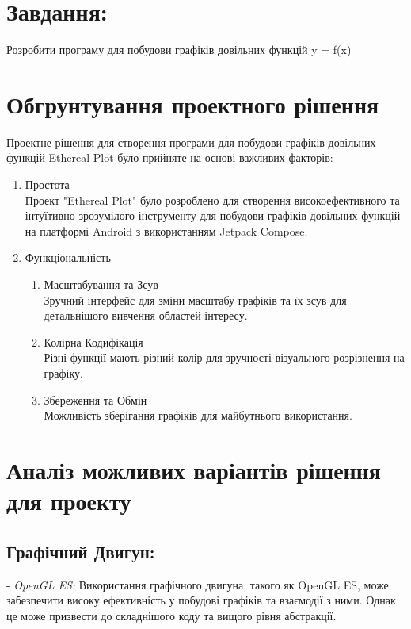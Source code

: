 \documentclass[14pt]{article}
\begin{document}
    \titlewithlabnum

    \tableofcontents
    \newpage


    \section{Завдання:}
    Розробити програму для побудови графіків довільних функцій y = f(x)


    \section{Обгрунтування проектного рішення}
    Проектне рішення для створення програми для побудови графіків довільних функцій Ethereal Plot було прийняте на основі важливих факторів:

    \begin{enumerate}
        \item Простота \\
        Проект "Ethereal Plot" було розроблено для створення високоефективного та інтуїтивно зрозумілого інструменту для побудови графіків довільних функцій на платформі Android з використанням Jetpack Compose.
        \item Функціональність
        \begin{enumerate}
            \item  Масштабування та Зсув \\
            Зручний інтерфейс для зміни масштабу графіків та їх зсув для детальнішого вивчення областей інтересу.
            \item Колірна Кодифікація \\
            Різні функції мають різний колір для зручності візуального розрізнення на графіку.
            \item  Збереження та Обмін \\
            Можливість зберігання графіків для майбутнього використання.
        \end{enumerate}
    \end{enumerate}
    
    \section{Аналіз можливих варіантів рішення для проекту}

        \subsection{Графічний Двигун:}
           - \textit{OpenGL ES:} Використання графічного двигуна, такого як OpenGL ES, може забезпечити високу ефективність у побудові графіків та взаємодії з ними. Однак це може призвести до складнішого коду та вищого рівня абстракції.
        
\end{document}
